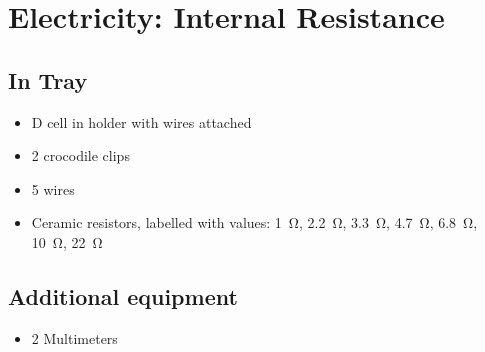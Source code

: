 \section{Electricity: Internal Resistance}


\subsection{In Tray}

\begin{itemize}
\item D cell in holder with wires attached
\item 2 crocodile clips
\item 5 wires
\item Ceramic resistors, labelled with values: \SI{1}{\ohm}, \SI{2.2}{\ohm}, \SI{3.3}{\ohm}, \SI{4.7}{\ohm}, \SI{6.8}{\ohm}, \SI{10}{\ohm}, \SI{22}{\ohm}
\end{itemize}


\subsection{Additional equipment}

\begin{itemize}
\item 2 Multimeters
\end{itemize}
